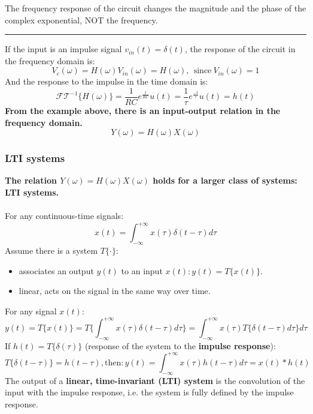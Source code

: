 \documentclass[12pt,a4paper]{article}
\begin{document}
\begin{tcolorbox}[breakable]
The frequency response of the circuit changes the magnitude and the phase of the complex exponential, NOT the frequency.
\vspace{0.5cm}
\hrule
\vspace{0.5cm}
If the input is an impulse signal $v_{in}(t) = \delta(t)$, the response of the circuit in the frequency domain is:
\[ V_{c}(\omega)  = H(\omega)V_{in}(\omega) = H(\omega), \ \ \text{since} \ V_{in}(\omega)=1\]
And the response to the impulse in the time domain is:
\[ \mathcal{FT}^{-1}\{ H(\omega) \} = \frac{1}{RC} e^{\frac{t}{RC}} u(t) = \frac{1}{\tau} e^{\frac{-t}{\tau}} u(t) = h(t) \]
\textbf{From the example above, there is an input-output relation in the frequency domain.}
\[ Y(\omega) =  H(\omega)  X(\omega) \]
\end{tcolorbox}

\subsubsection{LTI systems}
\textbf{The relation $Y(\omega) =  H(\omega)  X(\omega)$ holds for a larger class of systems: LTI systems.}\\\\
For any continuous-time signals:
\[ x(t) = \int_{-\infty}^{+\infty} x(\tau) \delta(t-\tau)d\tau \]
Assume there is a system $T\{ \cdot \}$:
\begin{itemize}
\item associates an output $y(t)$ to an input $x(t):y(t) = T\{x(t)\}$.
\item linear, acts on the signal in the same way over time.
\end{itemize}
For any signal $x(t)$:
\[ y(t) = T\{x(t)\} = T \bigg\{ \int_{-\infty}^{+\infty} x(\tau)\delta(t-\tau) d\tau \bigg\} = \int_{-\infty}^{+\infty} x(\tau)T\bigg\{\delta(t-\tau) d\tau \bigg\} d\tau \]
If  $h(t) = T\{\delta(\tau)\} $ (response of the system to the \textbf{impulse response}):
\[ T\{\delta(t-\tau) \} = h(t-\tau), \text{then}: y(t) = \int_{-\infty}^{+\infty} x(\tau)h(t-\tau)d\tau = x(t)*h(t) \]
The output of a \textbf{linear, time-invariant (LTI) system} is the convolution of the input with the impulse response, i.e. the system is fully defined by the impulse response.

\vspace{0.5cm}
\end{document}
